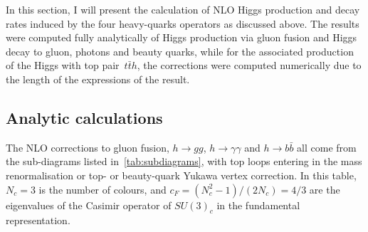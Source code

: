 In this section, I will present the calculation of NLO Higgs production and decay rates induced by the four heavy-quarks operators as discussed above. The results were computed fully analytically of Higgs production via gluon fusion and Higgs decay to gluon, photons and beauty quarks, while for the associated production of the Higgs with top pair~$ t\bar{t} h$, the corrections were computed numerically due to the length of the expressions of the result.

\subsection{Analytic calculations}
\par The NLO corrections to gluon fusion, $h \to gg$, $h\to \gamma \gamma$ and $ h \to b \bar{b}$ all come from the sub-diagrams listed in~\autoref{tab:subdiagrams}, with top loops entering in the mass renormalisation or top- or beauty-quark Yukawa vertex correction. In this table,  $N_c=3$ is the number of colours, and $c_F=(N_c^2-1)/(2N_c)=4/3$ are the eigenvalues of the Casimir operator of $SU(3)_c$ in the fundamental representation. 
